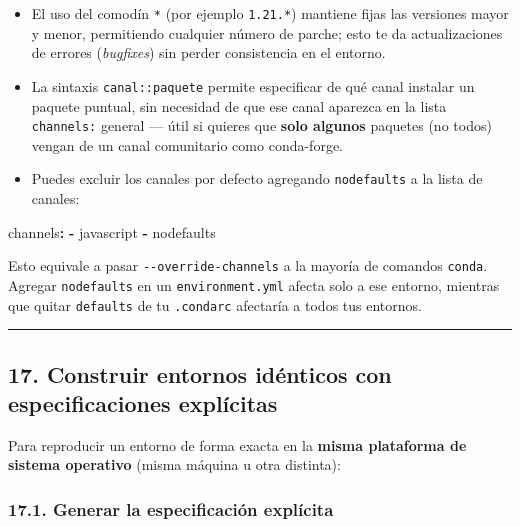 \documentclass[
  doc,
  floatsintext,
  longtable,
  a4paper,
  nolmodern,
  notxfonts,
  notimes,
  12pt,
  colorlinks=true,linkcolor=blue,citecolor=blue,urlcolor=blue]{apa7}
\newenvironment{Shaded}{\begin{snugshade}}{\end{snugshade}}
\newcommand{\AttributeTok}[1]{\textcolor[rgb]{0.40,0.45,0.13}{#1}}
\newcommand{\FunctionTok}[1]{\textcolor[rgb]{0.28,0.35,0.67}{#1}}
\newcommand{\KeywordTok}[1]{\textcolor[rgb]{0.00,0.23,0.31}{\textbf{#1}}}
\providecommand{\tightlist}{%
  \setlength{\itemsep}{0pt}\setlength{\parskip}{0pt}}
\begin{document}
\begin{itemize}
\tightlist
\item
  El uso del comodín \texttt{*} (por ejemplo \texttt{1.21.*}) mantiene
  fijas las versiones mayor y menor, permitiendo cualquier número de
  parche; esto te da actualizaciones de errores (\emph{bugfixes}) sin
  perder consistencia en el entorno.
\item
  La sintaxis \texttt{canal::paquete} permite especificar de qué canal
  instalar un paquete puntual, sin necesidad de que ese canal aparezca
  en la lista \texttt{channels:} general --- útil si quieres que
  \textbf{solo algunos} paquetes (no todos) vengan de un canal
  comunitario como conda-forge.
\item
  Puedes excluir los canales por defecto agregando \texttt{nodefaults} a
  la lista de canales:
\end{itemize}

\begin{Shaded}
\begin{Highlighting}[]
\FunctionTok{channels}\KeywordTok{:}
\AttributeTok{  }\KeywordTok{{-}}\AttributeTok{ javascript}
\AttributeTok{  }\KeywordTok{{-}}\AttributeTok{ nodefaults}
\end{Highlighting}
\end{Shaded}

Esto equivale a pasar \texttt{-\/-override-channels} a la mayoría de
comandos \texttt{conda}. Agregar \texttt{nodefaults} en un
\texttt{environment.yml} afecta solo a ese entorno, mientras que quitar
\texttt{defaults} de tu \texttt{.condarc} afectaría a todos tus
entornos.

\begin{center}\rule{0.5\linewidth}{0.5pt}\end{center}

\subsection{17. Construir entornos idénticos con especificaciones
explícitas}\label{construir-entornos-iduxe9nticos-con-especificaciones-expluxedcitas}

Para reproducir un entorno de forma exacta en la \textbf{misma
plataforma de sistema operativo} (misma máquina u otra distinta):

\subsubsection{17.1. Generar la especificación
explícita}\label{generar-la-especificaciuxf3n-expluxedcita}
\end{document}
